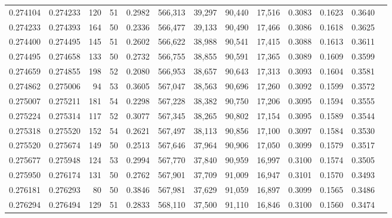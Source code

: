 \begin{tabular}{rrrrrrrrrrrrr}
0.274104 & 0.274233 &   120 &  51 &                                     0.2982 & 566,313 &  39,297 &  90,440 &  17,516 & 0.3083 & 0.1623 & 0.3640 \\
0.274233 & 0.274393 &   164 &  50 &                                     0.2336 & 566,477 &  39,133 &  90,490 &  17,466 & 0.3086 & 0.1618 & 0.3625 \\
0.274400 & 0.274495 &   145 &  51 &                                     0.2602 & 566,622 &  38,988 &  90,541 &  17,415 & 0.3088 & 0.1613 & 0.3611 \\
0.274495 & 0.274658 &   133 &  50 &                                     0.2732 & 566,755 &  38,855 &  90,591 &  17,365 & 0.3089 & 0.1609 & 0.3599 \\
0.274659 & 0.274855 &   198 &  52 &                                     0.2080 & 566,953 &  38,657 &  90,643 &  17,313 & 0.3093 & 0.1604 & 0.3581 \\
0.274862 & 0.275006 &    94 &  53 &                                     0.3605 & 567,047 &  38,563 &  90,696 &  17,260 & 0.3092 & 0.1599 & 0.3572 \\
0.275007 & 0.275211 &   181 &  54 &                                     0.2298 & 567,228 &  38,382 &  90,750 &  17,206 & 0.3095 & 0.1594 & 0.3555 \\
0.275224 & 0.275314 &   117 &  52 &                                     0.3077 & 567,345 &  38,265 &  90,802 &  17,154 & 0.3095 & 0.1589 & 0.3544 \\
0.275318 & 0.275520 &   152 &  54 &                                     0.2621 & 567,497 &  38,113 &  90,856 &  17,100 & 0.3097 & 0.1584 & 0.3530 \\
0.275520 & 0.275674 &   149 &  50 &                                     0.2513 & 567,646 &  37,964 &  90,906 &  17,050 & 0.3099 & 0.1579 & 0.3517 \\
0.275677 & 0.275948 &   124 &  53 &                                     0.2994 & 567,770 &  37,840 &  90,959 &  16,997 & 0.3100 & 0.1574 & 0.3505 \\
0.275950 & 0.276174 &   131 &  50 &                                     0.2762 & 567,901 &  37,709 &  91,009 &  16,947 & 0.3101 & 0.1570 & 0.3493 \\
0.276181 & 0.276293 &    80 &  50 &                                     0.3846 & 567,981 &  37,629 &  91,059 &  16,897 & 0.3099 & 0.1565 & 0.3486 \\
0.276294 & 0.276494 &   129 &  51 &                                     0.2833 & 568,110 &  37,500 &  91,110 &  16,846 & 0.3100 & 0.1560 & 0.3474 \\

\end{tabular}
